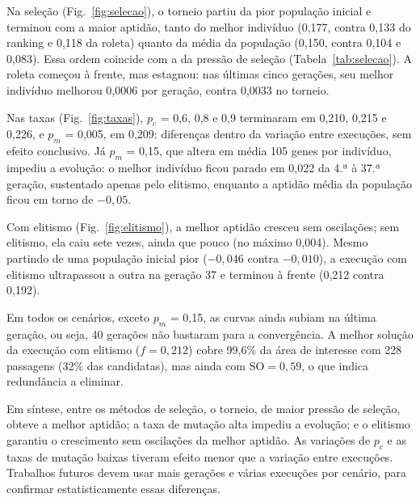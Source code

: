 Na seleção (Fig.~\ref{fig:selecao}), o torneio partiu da pior população inicial e terminou com a maior aptidão, tanto do melhor indivíduo (0,177, contra 0,133 do ranking e 0,118 da roleta) quanto da média da população (0,150, contra 0,104 e 0,083). Essa ordem coincide com a da pressão de seleção (Tabela~\ref{tab:selecao}). A roleta começou à frente, mas estagnou: nas últimas cinco gerações, seu melhor indivíduo melhorou 0,0006 por geração, contra 0,0033 no torneio.

Nas taxas (Fig.~\ref{fig:taxas}), $p_c$ = 0,6, 0,8 e 0,9 terminaram em 0,210, 0,215 e 0,226, e $p_m$ = 0,005, em 0,209: diferenças dentro da variação entre execuções, sem efeito conclusivo. Já $p_m$ = 0,15, que altera em média 105 genes por indivíduo, impediu a evolução: o melhor indivíduo ficou parado em 0,022 da 4.ª à 37.ª geração, sustentado apenas pelo elitismo, enquanto a aptidão média da população ficou em torno de $-0,05$.

Com elitismo (Fig.~\ref{fig:elitismo}), a melhor aptidão cresceu sem oscilações; sem elitismo, ela caiu sete vezes, ainda que pouco (no máximo 0,004). Mesmo partindo de uma população inicial pior ($-0,046$ contra $-0,010$), a execução com elitismo ultrapassou a outra na geração 37 e terminou à frente (0,212 contra 0,192).

Em todos os cenários, exceto $p_m$ = 0,15, as curvas ainda subiam na última geração, ou seja, 40 gerações não bastaram para a convergência. A melhor solução da execução com elitismo ($f = 0,212$) cobre 99,6\% da área de interesse com 228 passagens (32\% das candidatas), mas ainda com $\mathrm{SO} = 0,59$, o que indica redundância a eliminar.

Em síntese, entre os métodos de seleção, o torneio, de maior pressão de seleção, obteve a melhor aptidão; a taxa de mutação alta impediu a evolução; e o elitismo garantiu o crescimento sem oscilações da melhor aptidão. As variações de $p_c$ e as taxas de mutação baixas tiveram efeito menor que a variação entre execuções. Trabalhos futuros devem usar mais gerações e várias execuções por cenário, para confirmar estatisticamente essas diferenças.
